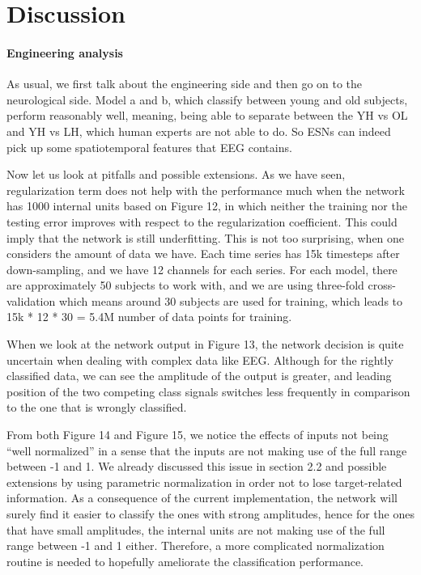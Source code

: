 \documentclass[a4paper,11pt,oneside]{article}
\begin{document}
\section{Discussion}
\paragraph{Engineering analysis}
As usual, we first talk about the engineering side and then go on to the neurological side.  Model a and b, which classify between young and old subjects, perform reasonably well, meaning, being able to separate between the YH vs OL and YH vs LH, which human experts are not able to do. So ESNs can indeed pick up some spatiotemporal features that EEG contains.
 
 Now let us look at pitfalls and possible extensions. As we have seen, regularization term does not help with the performance much when the network has 1000 internal units based on Figure 12, in which neither the training nor the testing error improves with respect to the regularization coefficient. This could imply that the network is still underfitting. This is not too surprising, when one considers the amount of data we have. Each time series has 15k timesteps after down-sampling, and we have 12 channels for each series. For each model, there are approximately 50 subjects to work with, and we are using three-fold cross-validation which means around 30 subjects are used for training, which leads to 15k * 12 * 30 = 5.4M number of data points for training.

When we look at the network output in Figure 13, the network decision is quite uncertain when dealing with complex data like EEG. Although for the rightly classified data, we can see the amplitude of the output is greater, and leading position of the two competing class signals switches less frequently in comparison to the one that is wrongly classified.  

From both Figure 14 and Figure 15, we notice the effects of inputs not being ``well normalized'' in a sense that the inputs are not making use of the full range between -1 and 1. We already discussed this issue in section 2.2 and possible extensions by using parametric normalization in order not to lose target-related information. As a consequence of the current implementation, the network will surely find it easier to classify the ones with strong amplitudes, hence for the ones that have small amplitudes, the internal units are not making use of the full range between -1 and 1 either. Therefore, a more complicated normalization routine is needed to hopefully ameliorate the classification performance.
\end{document}
